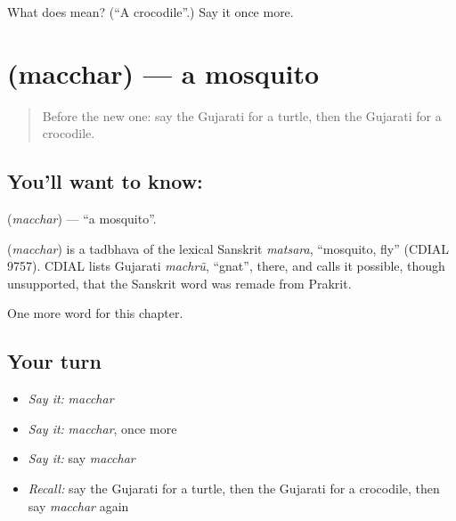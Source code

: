 \begin{tcolorbox}[breakable,colback=teal!4,colframe=teal!35!black,title={Before you move on}]
What does  mean? (\textquotedblleft{}A crocodile\textquotedblright{}.) Say it once more.
\end{tcolorbox}
\section[\texorpdfstring{\gu{મચ્છર} (macchar)}{મચ્છર (macchar)}]{ (macchar) — a mosquito}

\label{lesson:GU-C123-macchar}



\begin{quote}
Before the new one: say the Gujarati for a turtle, then the Gujarati for a crocodile.
\end{quote}

\subsection*{You'll want to know: }
\textbf{} (\emph{macchar}) — \textquotedblleft{}a mosquito\textquotedblright{}.

\begin{cousinweb}
\textbf{} (\emph{macchar}) is a tadbhava of the lexical Sanskrit \emph{matsara}, \textquotedblleft{}mosquito, fly\textquotedblright{} (CDIAL 9757). CDIAL lists Gujarati \emph{machrũ}, \textquotedblleft{}gnat\textquotedblright{}, there, and calls it possible, though unsupported, that the Sanskrit word was remade from Prakrit.
\end{cousinweb}

\begin{grammarlens}[title={What you've built}]
One more word for this chapter.
\end{grammarlens}

\subsection*{Your turn}
\begin{itemize}
\raggedright
  \item \emph{Say it:} \emph{macchar}
  \item \emph{Say it:} \emph{macchar}, once more
  \item \emph{Say it:} say \emph{macchar}
  \item \emph{Recall:} say the Gujarati for a turtle, then the Gujarati for a crocodile, then say \emph{macchar} again
\end{itemize}


